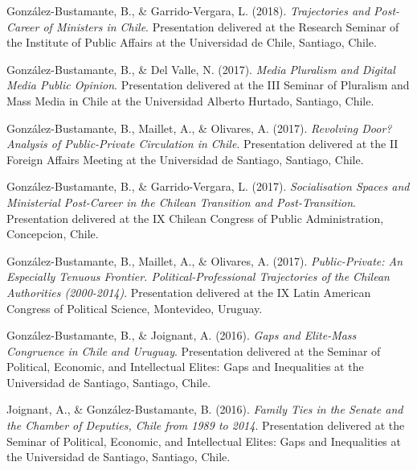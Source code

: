 \begin{publications}
\begin{benumerate}{66}
\item{\small González-Bustamante, B., \& Garrido-Vergara, L. (2018). {\itshape Trajectories and Post-Career of Ministers in Chile}. Presentation delivered at the Research Seminar of the Institute of Public Affairs at the Universidad de Chile, Santiago, Chile.}\vspace{1mm}

\item{\small González-Bustamante, B., \& Del Valle, N. (2017). {\itshape Media Pluralism and Digital Media Public Opinion}. Presentation delivered at the III Seminar of Pluralism and Mass Media in Chile at the Universidad Alberto Hurtado, Santiago, Chile.}\vspace{1mm}

\item{\small González-Bustamante, B., Maillet, A., \& Olivares, A. (2017). {\itshape Revolving Door? Analysis of Public-Private Circulation in Chile}. Presentation delivered at the II Foreign Affairs Meeting at the Universidad de Santiago, Santiago, Chile.}\vspace{1mm}

\item{\small González-Bustamante, B., \& Garrido-Vergara, L. (2017). {\itshape Socialisation Spaces and Ministerial Post-Career in the Chilean Transition and Post-Transition}. Presentation delivered at the IX Chilean Congress of Public Administration, Concepcion, Chile.}\vspace{1mm}

\item{\small González-Bustamante, B., Maillet, A., \& Olivares, A. (2017). {\itshape Public-Private: An Especially Tenuous Frontier. Political-Professional Trajectories of the Chilean Authorities (2000-2014)}. Presentation delivered at the IX Latin American Congress of Political Science, Montevideo, Uruguay.}\vspace{1mm}

\item{\small González-Bustamante, B., \& Joignant, A. (2016). {\itshape Gaps and Elite-Mass Congruence in Chile and Uruguay}. Presentation delivered at the Seminar of Political, Economic, and Intellectual Elites: Gaps and Inequalities at the Universidad de Santiago, Santiago, Chile.}\vspace{1mm}

\item{\small Joignant, A., \& González-Bustamante, B. (2016). {\itshape Family Ties in the Senate and the Chamber of Deputies, Chile from 1989 to 2014}. Presentation delivered at the Seminar of Political, Economic, and Intellectual Elites: Gaps and Inequalities at the Universidad de Santiago, Santiago, Chile.}\vspace{1mm}


\end{benumerate}
\end{publications}
